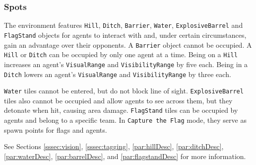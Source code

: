 \documentclass[a4paper,english,DIV=16,11pt,parskip=half,dvipsnames,listof=totoc,index=totoc,bibliography=totoc]{scrartcl}
\begin{document}
\subsubsection{Spots} \label{sssec:spot}
The environment features \texttt{Hill}, \texttt{Ditch}, \texttt{Barrier}, \texttt{Water}, \texttt{ExplosiveBarrel} and \texttt{FlagStand} objects for agents to interact with and, under certain circumstances, gain an advantage over their opponents. A \texttt{Barrier} object cannot be occupied. A \texttt{Hill} or \texttt{Ditch} can be occupied by only one agent at a time. Being on a \texttt{Hill} increases an agent's \texttt{VisualRange} and \texttt{VisibilityRange} by five each. Being in a \texttt{Ditch} lowers an agent's \texttt{VisualRange} and \texttt{VisibilityRange} by three each.

\texttt{Water} tiles cannot be entered, but do not block line of sight. \texttt{ExplosiveBarrel} tiles also cannot be occupied and allow agents to see across them, but they detonate when hit, causing area damage. \texttt{FlagStand} tiles can be occupied by agents and belong to a specific team. In \texttt{Capture the Flag} mode, they serve as spawn points for flags and agents.

See Sections \ref{sssec:vision}, \ref{sssec:tagging}, \ref{par:hillDesc}, \ref{par:ditchDesc}, \ref{par:waterDesc}, \ref{par:barrelDesc}, and \ref{par:flagstandDesc} for more information.
\end{document}
